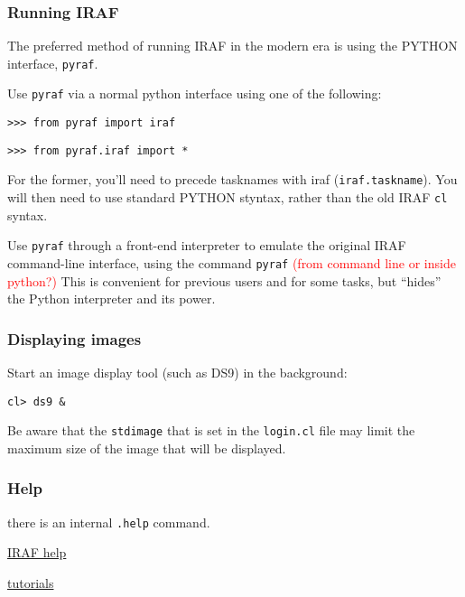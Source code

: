 \documentclass{article}
\begin{document}
\subsubsection*{Running IRAF}
The preferred method of running IRAF in the modern era is using the
PYTHON interface, \verb|pyraf|.
\begin{itemize*}
    \item Use \verb|pyraf| via a normal python interface using one of
        the following:
        \begin{list}{}
            \item \verb|>>> from pyraf import iraf|
            \item \verb|>>> from pyraf.iraf import *|
        \end{list}
        For the former, you'll need to precede tasknames with iraf
        (\verb|iraf.taskname|).
        You will then need to use standard PYTHON styntax, rather
        than the old IRAF \verb|cl| syntax.
    \item Use \verb|pyraf| through a front-end interpreter to emulate the
        original IRAF command-line interface, using the command
        \verb|pyraf| \textcolor{red}{(from command line or inside python?)}
        This is convenient for previous users and for some tasks,
        but ``hides'' the Python interpreter and its power.
\end{itemize*}

\subsubsection*{Displaying images}
Start an image display tool (such as DS9) in the background:
\begin{verbatim}
cl> ds9 &
\end{verbatim}
Be aware that the
\verb|stdimage| that is set in the \verb|login.cl| file may limit the
maximum size of the image that will be displayed.

\subsubsection*{Help}
\begin{itemize*}
    \item there is an internal \texttt{.help} command.
    \item \href{http://iraf.noao.edu/iraf-help.html}
        {IRAF help}
    \item \href{http://iraf.noao.edu/iraf/web/tutorials/tutorials.html}
        {tutorials}
\end{itemize*}
\end{document}
